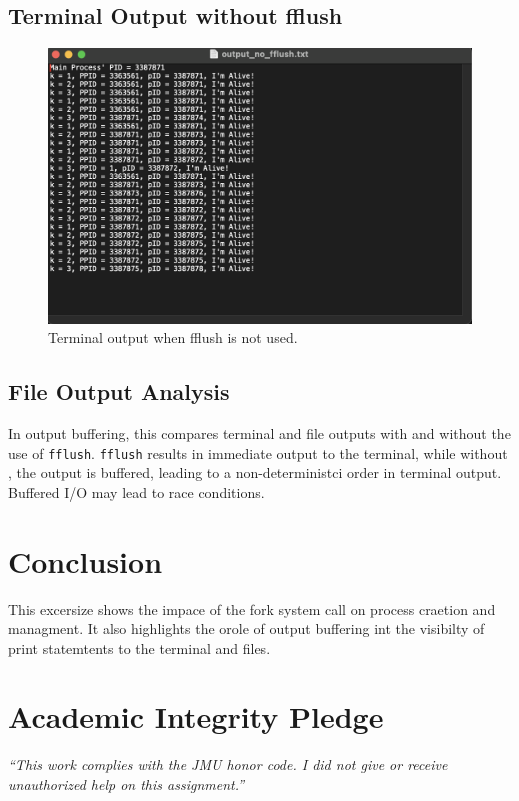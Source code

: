 \documentclass[12pt]{article}
\begin{document}
\newpage
  \subsection{Terminal Output without fflush}
  \begin{figure}[h]
    \centering
    \includegraphics[width=17cm]{output_no_fflush.png}
    \caption{Terminal output when fflush is not used.}
  \end{figure}

\subsection{File Output Analysis}
In output buffering, this compares terminal and file outputs with and without the use of \texttt{fflush}. \texttt{fflush} results in immediate output to the terminal, while without , the output is buffered, leading to a non-deterministci order in terminal output. Buffered I/O may lead to race conditions. 

\section{Conclusion}
This excersize shows the impace of the fork system call on process craetion and managment. It also highlights the orole of output buffering int the visibilty of print statemtents to the terminal and files. 

\vfill
  \section*{Academic Integrity Pledge}
    {\color{red}\textit{“This work complies with the JMU honor code. I did not give or receive unauthorized help on this assignment.”}}
\end{document}
